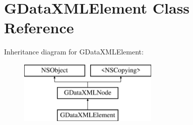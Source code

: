\hypertarget{interface_g_data_x_m_l_element}{\section{G\+Data\+X\+M\+L\+Element Class Reference}
\label{interface_g_data_x_m_l_element}
}
Inheritance diagram for G\+Data\+X\+M\+L\+Element\+:\begin{figure}[H]
\begin{center}
\leavevmode
\includegraphics[height=3.000000cm]{interface_g_data_x_m_l_element}
\end{center}
\end{figure}
